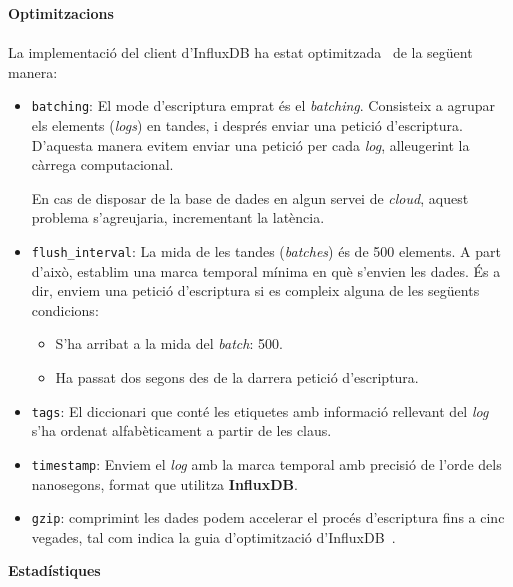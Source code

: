 \clearpage

\noindent
\textbf{Optimitzacions} \\ \\

\noindent
La implementació del client d'InfluxDB ha estat optimitzada~\cite{influxdb:optimizations} de la següent manera:

\begin{itemize}
    \item \texttt{batching}: El mode d'escriptura emprat és el \textit{batching}.
    Consisteix a agrupar els elements (\textit{\gls{log}s}) en tandes, i després enviar una petició d'escriptura.
    D'aquesta manera evitem enviar una petició per cada \textit{log}, alleugerint la càrrega computacional.
    \begin{tcolorbox}[colback=red!5!white, colframe=red!75!black, title=Sobrecàrrega]
    En cas de disposar de la base de dades en algun servei de \textit{cloud}, aquest problema s'agreujaria, incrementant la latència.
    \end{tcolorbox}
    \item \texttt{flush\_interval}: La mida de les tandes (\textit{batches}) és de 500 elements.
    A part d’això, establim una marca temporal mínima en què s’envien les dades.
    És a dir, enviem una petició d’escriptura si es compleix alguna de les següents condicions:
    \begin{itemize}
        \item S’ha arribat a la mida del \textit{batch}: 500.
        \item Ha passat dos segons des de la darrera petició d’escriptura.
    \end{itemize}
    \item \texttt{tags}: El diccionari que conté les etiquetes amb informació rellevant del \textit{\gls{log}} s’ha ordenat alfabèticament a partir de les claus.
    \item \texttt{\gls{timestamp}}: Enviem el \textit{\gls{log}} amb la marca temporal amb precisió de l’orde dels nanosegons, format que utilitza \textbf{InfluxDB}.
    \item \texttt{\gls{gzip}}: comprimint les dades podem accelerar el procés d’escriptura fins a cinc vegades, tal com indica la guia d'optimització d'InfluxDB~\cite{influxdb:optimizations}.
\end{itemize}

\clearpage

\noindent
\textbf{Estadístiques} \\ \\


